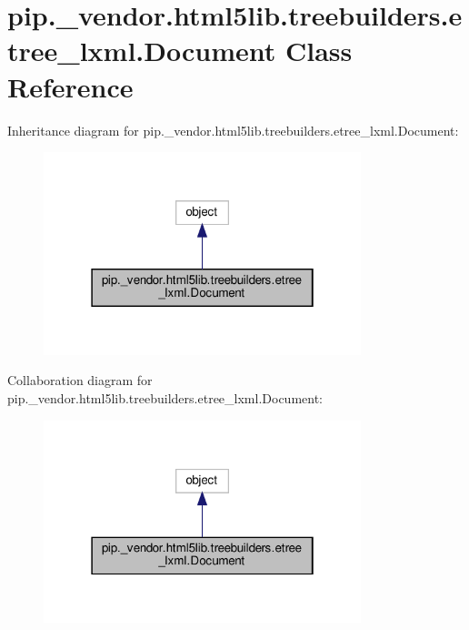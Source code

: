 \hypertarget{classpip_1_1__vendor_1_1html5lib_1_1treebuilders_1_1etree__lxml_1_1Document}{}\section{pip.\+\_\+vendor.\+html5lib.\+treebuilders.\+etree\+\_\+lxml.\+Document Class Reference}
\label{classpip_1_1__vendor_1_1html5lib_1_1treebuilders_1_1etree__lxml_1_1Document}


Inheritance diagram for pip.\+\_\+vendor.\+html5lib.\+treebuilders.\+etree\+\_\+lxml.\+Document\+:
\nopagebreak
\begin{figure}[H]
\begin{center}
\leavevmode
\includegraphics[width=262pt]{classpip_1_1__vendor_1_1html5lib_1_1treebuilders_1_1etree__lxml_1_1Document__inherit__graph}
\end{center}
\end{figure}


Collaboration diagram for pip.\+\_\+vendor.\+html5lib.\+treebuilders.\+etree\+\_\+lxml.\+Document\+:
\nopagebreak
\begin{figure}[H]
\begin{center}
\leavevmode
\includegraphics[width=262pt]{classpip_1_1__vendor_1_1html5lib_1_1treebuilders_1_1etree__lxml_1_1Document__coll__graph}
\end{center}
\end{figure}
